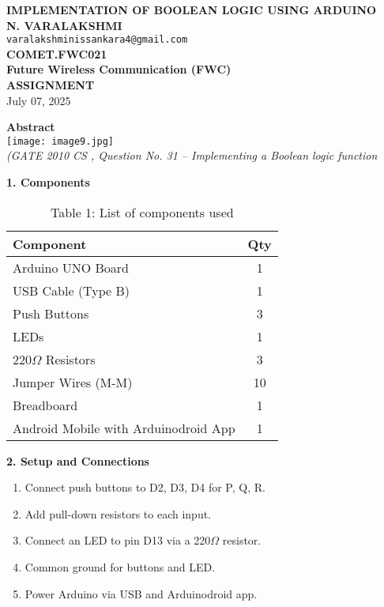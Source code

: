 \documentclass[12pt]{article}
\begin{document}
\begin{center}
    \textbf{\Large IMPLEMENTATION OF BOOLEAN LOGIC USING ARDUINO} \\
    \textbf{N. VARALAKSHMI} \\
    \texttt{varalakshminissankara4@gmail.com} \\
    \textbf{COMET.FWC021} \\
    \textbf{Future Wireless Communication (FWC)} \\
    \textbf{ASSIGNMENT} \\[5pt]
    July 07, 2025
\end{center}
\vspace{1em}

\begin{multicols}{2}

\noindent\textbf{Abstract} \\[0.5em]
\texttt{[image: image9.jpg]} \\[0.5em]
\textit{(GATE 2010 CS , Question No. 31 – Implementing a Boolean logic function}

\vspace{1em}
\noindent\textbf{1. Components}
\begin{table}[H]
\small
\centering
\begin{tabular}{|p{4.2cm}|c|}
\hline
\textbf{Component} & \textbf{Qty} \\
\hline
Arduino UNO Board & 1 \\
USB Cable (Type B) & 1 \\
Push Buttons & 3 \\
LEDs & 1 \\
220$\Omega$ Resistors & 3 \\
Jumper Wires (M-M) & 10 \\
Breadboard & 1 \\
Android Mobile with Arduinodroid App & 1 \\
\hline
\end{tabular}
\caption*{Table 1: List of components used}
\end{table}

\vspace{1em}
\noindent\textbf{2. Setup and Connections}
\begin{enumerate}
    \item Connect push buttons to D2, D3, D4 for P, Q, R.
    \item Add pull-down resistors to each input.
    \item Connect an LED to pin D13 via a 220$\Omega$ resistor.
    \item Common ground for buttons and LED.
    \item Power Arduino via USB and Arduinodroid app.
\end{enumerate}


\end{multicols}
\end{document}
